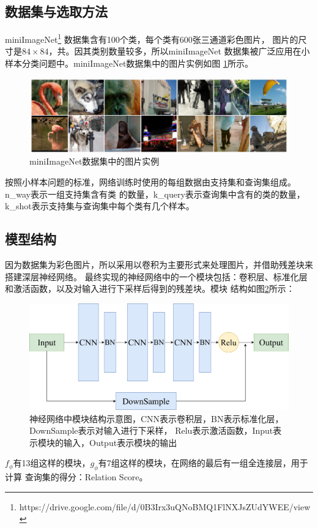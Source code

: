 \subsection{数据集与选取方法}

miniImageNet\footnote{\ttfamily\scriptsize https://drive.google.com/file/d/0B3Irx3uQNoBMQ1FlNXJsZUdYWEE/view}
数据集含有100个类，每个类有600张三通道彩色图片，
图片的尺寸是$84\times 84$，共。因其类别数量较多，所以miniImageNet
数据集被广泛应用在小样本分类问题中。miniImageNet数据集中的图片实例如图
\ref{mini}所示。

\begin{figure}[h]
    \centering
    \includegraphics[scale=0.2]{figure/1.png}
    \caption{miniImageNet数据集中的图片实例}
    \label{mini}
\end{figure}

按照小样本问题的标准，网络训练时使用的每组数据由支持集和查询集组成。n\_way表示一组支持集含有类
的数量，k\_query表示查询集中含有的类的数量，k\_shot表示支持集与查询集中每个类有几个样本。

\subsection{模型结构}

因为数据集为彩色图片，所以采用以卷积为主要形式来处理图片，并借助残差块来搭建深层神经网络\cite{dnn}。
最终实现的神经网络中的一个模块包括：卷积层、标准化层和激活函数，以及对输入进行下采样后得到的残差块。模块
结构如图\ref{fig:module}所示：

\begin{figure}[ht]
    \centering
    \includegraphics[scale=0.08]{figure/network.png}
    \caption{神经网络中模块结构示意图，CNN表示卷积层，BN表示标准化层，DownSample表示对输入进行下采样，
    Relu表示激活函数，Input表示模块的输入，Output表示模块的输出}
    \label{fig:module}
\end{figure}

$f_\phi$有13组这样的模块，$g_\phi$有7组这样的模块，在网络的最后有一组全连接层，用于计算
查询集的得分：Relation Score。
